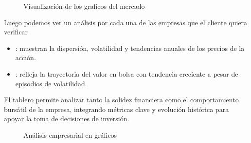 \documentclass[letterpaper,10pt,spanish]{sphinxmanual}
\begin{document}
\sphinxAtStartPar
{}

\begin{figure}[htbp]
\centering
\capstart

\noindent{}
\caption{ Visualización de los graficos del mercado}\label{\detokenize{ImplementacionAcesorIA:id1}}\end{figure}

\sphinxAtStartPar
Luego podemos ver un análisis por cada una de las empresas que el cliente quiera verificar
\begin{itemize}
\item {} 
\sphinxAtStartPar
{}: muestran la dispersión, volatilidad y tendencias anuales de los precios de la acción.

\item {} 
\sphinxAtStartPar
{}: refleja la trayectoria del valor en bolsa con tendencia creciente a pesar de episodios de volatilidad.

\end{itemize}

\sphinxAtStartPar
El tablero permite analizar tanto la solidez financiera como el comportamiento bursátil de la empresa, integrando métricas clave y evolución histórica para apoyar la toma de decisiones de inversión.

\begin{figure}[htbp]
\centering
\capstart

\noindent{}
\caption{ Análisis empresarial en gráficos}\label{\detokenize{ImplementacionAcesorIA:id2}}\end{figure}
\end{document}
